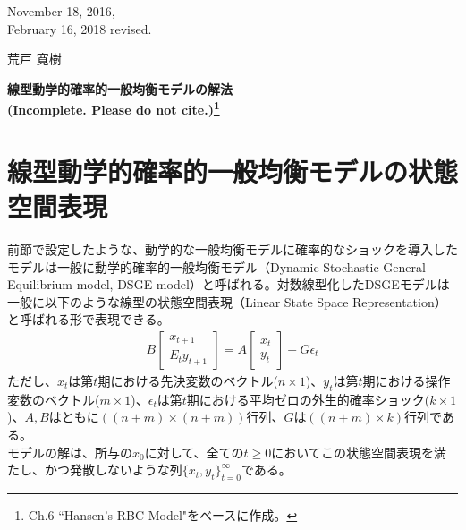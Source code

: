 \documentclass[a4j, dvipdfmx]{jarticle}
\begin{document}
\begin{flushright}
November 18, 2016,\\
February 16, 2018 revised.

荒戸 寛樹
\end{flushright}
\begin{center}
\Large{\textbf{
線型動学的確率的一般均衡モデルの解法 \\ (Incomplete. Please do not cite.)\footnote{\citet{mccan2008:abcs} Ch.6 ``Hansen's RBC Model"をベースに作成。}
}}
\end{center}
\vspace{10pt}
\section{線型動学的確率的一般均衡モデルの状態空間表現}
前節で設定したような、動学的な一般均衡モデルに確率的なショックを導入したモデルは一般に動学的確率的一般均衡モデル（Dynamic Stochastic General Equilibrium model, DSGE model）と呼ばれる。対数線型化したDSGEモデルは一般に以下のような線型の状態空間表現（Linear State Space Representation）と呼ばれる形で表現できる。
\begin{align}
B\begin{bmatrix}x_{t+1}\\E_t y_{t+1}\end{bmatrix} = A\begin{bmatrix}x_t\\y_t\end{bmatrix} + G\epsilon_t\label{ssr}
\end{align}
ただし、$x_t$は第$t$期における先決変数のベクトル($n\times 1$)、$y_t$は第$t$期における操作変数のベクトル($m\times 1$)、$\epsilon_t$は第$t$期における平均ゼロの外生的確率ショック($k\times 1$)、$A, B$はともに$((n+m)\times (n+m))$行列、$G$は$((n+m)\times k)$行列である。\\

モデルの解は、所与の$x_0$に対して、全ての$t\ge0$においてこの状態空間表現を満たし、かつ発散しないような列$\{x_t, y_t\}_{t=0}^\infty$である。
\end{document}
